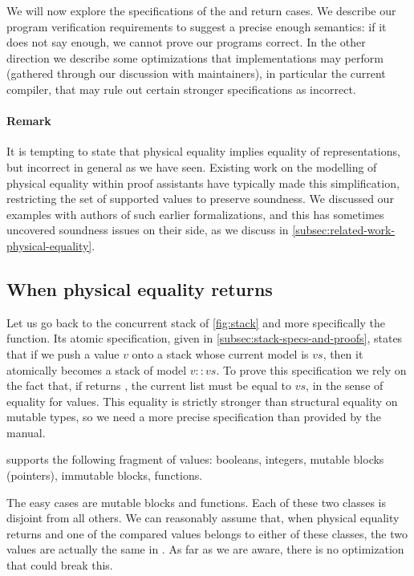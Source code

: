 We will now explore the specifications of the  and  return cases. We describe our program verification requirements to suggest a precise enough semantics: if it does not say enough, we cannot prove our programs correct. In the other direction we describe some optimizations that \OCaml implementations may perform (gathered through our discussion with \OCaml maintainers), in particular the current compiler, that may rule out certain stronger specifications as incorrect.

\paragraph{Remark} It is tempting to state that physical equality implies equality of \Rocq representations, but incorrect in general as we have seen. Existing work on the modelling of \OCaml physical equality within proof assistants have typically made this simplification, restricting the set of supported values to preserve soundness. We discussed our examples with authors of such earlier formalizations, and this has sometimes uncovered soundness issues on their side, as we discuss in \cref{subsec:related-work-physical-equality}.

\subsection{When physical equality returns }

Let us go back to the concurrent stack of \cref{fig:stack} and more specifically the  function. Its atomic specification, given in \cref{subsec:stack-specs-and-proofs}, states that if we push a value $v$ onto a stack whose current model is $vs$, then it atomically becomes a stack of model $v :: vs$.
To prove this specification we rely on the fact that, if  returns , the current list must be equal to $vs$, in the sense of \Rocq equality for \Zoo values. This equality is strictly stronger than structural equality on mutable types, so we need a more precise specification than provided by the \OCaml manual.

\Zoo supports the following fragment of \OCaml values: booleans, integers, mutable blocks (pointers), immutable blocks, functions.

The easy cases are mutable blocks and functions.
Each of these two classes is disjoint from all others.
We can reasonably assume that, when physical equality returns  and one of the compared values belongs to either of these classes, the two values are actually the same in \Rocq.
As far as we are aware, there is no optimization that could break this.

